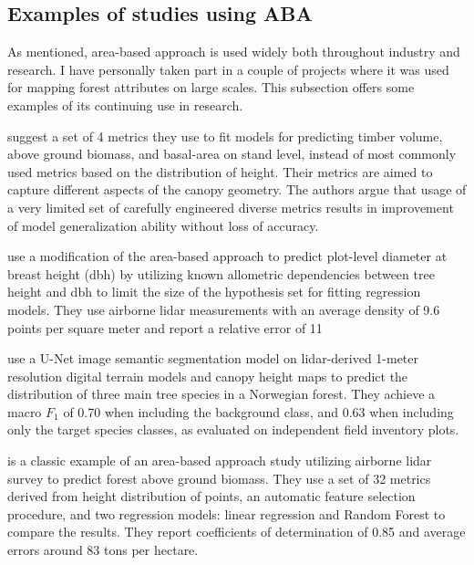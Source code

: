 \subsection{Examples of studies using ABA}

As mentioned, area-based approach is used widely both throughout industry and research.
I have personally taken part in a couple of projects where it was used for mapping forest attributes on large scales.
This subsection offers some examples of its continuing use in research.

\citet{bouvierGeneralizingPredictiveModels2015} suggest a set of 4 metrics they use to fit models for predicting timber volume, above ground biomass, and basal-area on stand level, instead of most commonly used metrics based on the distribution of height.
Their metrics are aimed to capture different aspects of the canopy geometry.
The authors argue that usage of a very limited set of carefully engineered diverse metrics results in improvement of model generalization ability without loss of accuracy.

\citet{zhangImprovedAreabasedApproach2023} use a modification of the area-based approach to predict plot-level diameter at breast height (dbh) by utilizing known allometric dependencies between tree height and dbh to limit the size of the hypothesis set for fitting regression models.
They use airborne \gls{lidar} measurements with an average density of 9.6 points per square meter and report a relative error of 11%

\citet{vermeerLidarbasedNorwegianTree2023} use a U-Net \citep{ronnebergerUNetConvolutionalNetworks2015} image semantic segmentation model on \gls{lidar}-derived 1-meter resolution digital terrain models and canopy height maps to predict the distribution of three main tree species in a Norwegian forest.
They achieve a macro $F_1$ of 0.70 when including the background class, and 0.63 when including only the target species classes, as evaluated on independent field inventory plots.

\citet{kcEstimationAboveGroundForest2024} is a classic example of an area-based approach study utilizing airborne \gls{lidar} survey to predict forest above ground biomass.
They use a set of 32 metrics derived from height distribution of points, an automatic feature selection procedure, and two regression models: linear regression and Random Forest to compare the results.
They report coefficients of determination of 0.85 and average errors around 83 tons per hectare.


